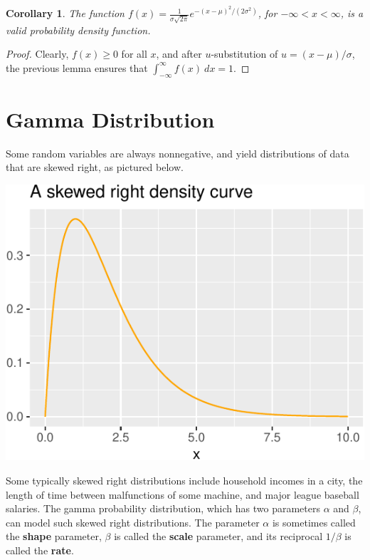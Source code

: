 \documentclass[
]{book}
\newtheorem{corollary}{Corollary}[chapter]
\theoremstyle{definition}
\theoremstyle{definition}
\theoremstyle{definition}
\theoremstyle{definition}
\theoremstyle{remark}
\begin{document}
\begin{corollary}
The function \(f(x) = \frac{1}{\sigma\sqrt{2\pi}}e^{-(x-\mu)^2/(2\sigma^2)}\), for \(-\infty < x <  \infty\), is a valid probability density function.
\end{corollary}

\begin{proof}
Clearly, \(f(x) \geq 0\) for all \(x\), and after \(u\)-substitution of \(u = (x-\mu)/\sigma\), the previous lemma ensures that \(\int_{-\infty}^\infty f(x)~dx = 1\).
\end{proof}

\section{Gamma Distribution}\label{gamma-distribution}

Some random variables are always nonnegative, and yield distributions of data that are skewed right, as pictured below.

\includegraphics{math340-notes_files/figure-latex/unnamed-chunk-21-1.pdf}

Some typically skewed right distributions include household incomes in a city, the length of time between malfunctions of some machine, and major league baseball salaries. The gamma probability distribution, which has two parameters \(\alpha\) and \(\beta\), can model such skewed right distributions. The parameter \(\alpha\) is sometimes called the \textbf{shape} parameter, \(\beta\) is called the \textbf{scale} parameter, and its reciprocal \(1/\beta\) is called the \textbf{rate}.
\end{document}
